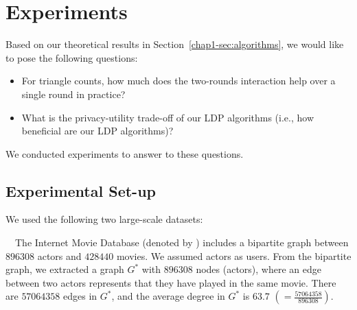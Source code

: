 \section{Experiments}
\label{chap1-sec:experiments}

Based on our theoretical results in Section~\ref{chap1-sec:algorithms}, we would like to pose the following questions:
\begin{itemize}
    \item For triangle counts, how much does the two-rounds interaction help over a single round in practice?
    \item What is the privacy-utility trade-off 
    of our LDP algorithms 
    (i.e., how beneficial are our LDP algorithms)?
\end{itemize}
We conducted experiments to answer to these questions. 

\subsection{Experimental Set-up}
\label{chap1-sub:setup}
We used the following two large-scale datasets:

\smallskip
~~The Internet Movie Database (denoted by \IMDB{}) 
\cite{IMDB_GD05} 
includes a bipartite graph between $896308$ actors and $428440$ movies. 
We assumed actors as users. 
From the bipartite graph, we extracted 
a graph $G^*$ with $896308$ nodes (actors), where an edge between two actors represents that they have played in the same movie. 
There are $57064358$ edges in $G^*$, and the average degree in $G^*$ is $63.7$ $(=\frac{57064358}{896308})$.

